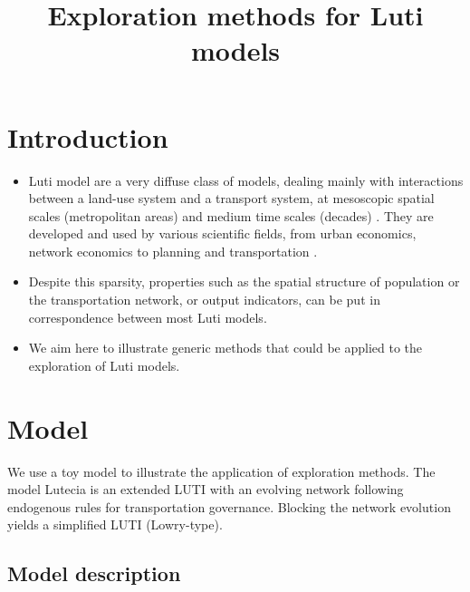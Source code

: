 


\title{Exploration methods for Luti models}
\author{}
\date{}


\maketitle

\justify





\section{Introduction}

\begin{itemize}
	\item Luti model are a very diffuse class of models, dealing mainly with interactions between a land-use system and a transport system, at mesoscopic spatial scales (metropolitan areas) and medium time scales (decades) \cite{raimbault2018phdthesis}. They are developed and used by various scientific fields, from urban economics, network economics to planning and transportation \cite{raimbault:halshs-01584894}.
	\item Despite this sparsity, properties such as the spatial structure of population or the transportation network, or output indicators, can be put in correspondence between most Luti models.
	\item We aim here to illustrate generic methods that could be applied to the exploration of Luti models. 
\end{itemize}


\section{Model}

We use a toy model to illustrate the application of exploration methods. The model Lutecia \cite{lenechet:halshs-01272236} is an extended LUTI with an evolving network following endogenous rules for transportation governance. Blocking the network evolution yields a simplified LUTI (Lowry-type).

\subsection{Model description}

